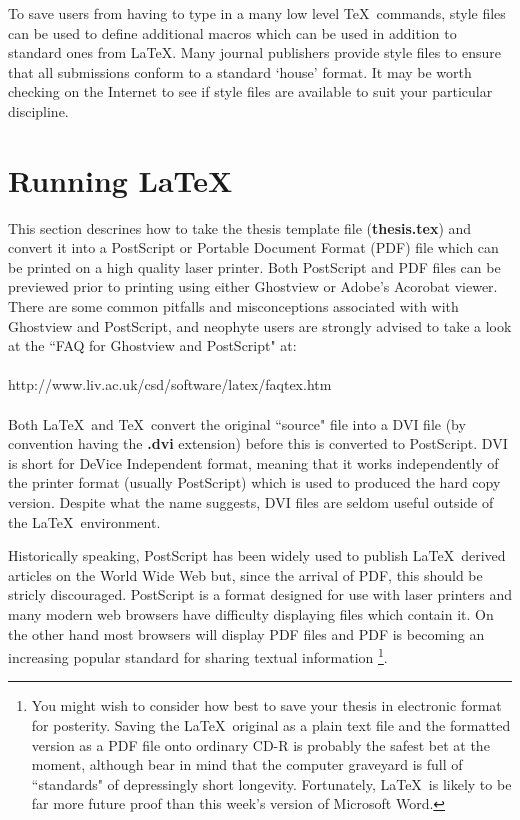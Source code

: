 \documentclass[11pt,oneside]{book}
\begin{document}
To save users from having to type in a many low level
\TeX \ commands, style files can be used to define additional
macros which can be used in addition to standard ones from
\LaTeX. Many journal publishers provide style files to ensure
that all submissions conform to a standard `house' format. It may
be worth checking on the Internet to see if style files are available
to suit your particular discipline.

\section{Running \LaTeX}
This section descrines how to take the thesis template file
({\bf thesis.tex}) and convert it into a PostScript or Portable
Document Format (PDF) file which can be printed on a high quality
laser printer. Both PostScript and PDF files can be previewed
prior to printing using either Ghostview or Adobe's Acorobat
viewer. There are some common pitfalls and misconceptions associated with
with Ghostview and PostScript, and neophyte users are strongly
advised to take a look at the ``FAQ for Ghostview and PostScript"
at:
\\
\\
http://www.liv.ac.uk/csd/software/latex/faqtex.htm
\\
\\
Both \LaTeX \ and \TeX \ convert the original ``source" file
into a DVI file (by convention having the {\bf .dvi} extension)
before this is converted to PostScript. DVI is short
for DeVice Independent format, meaning that it works
independently of the printer format (usually PostScript)
which is used to produced the hard copy version. Despite
what the name suggests, DVI files are seldom useful outside
of the \LaTeX \ environment.

Historically speaking, PostScript has been widely used to
publish \LaTeX \ derived articles
on the World Wide Web but, since the arrival of PDF, this should be
stricly discouraged. PostScript is a format designed for use with
laser printers and many modern web browsers have difficulty displaying
files which contain it. On the other hand most browsers will display
PDF files and PDF is becoming an increasing popular standard for sharing
textual information
\footnote{
You might wish to consider how best to save your thesis in electronic format
for posterity. Saving the \LaTeX \ original as a plain text file and
the formatted version as a PDF file
onto
ordinary CD-R is probably the safest bet at the moment, although bear in mind
that the computer graveyard is full of ``standards" of depressingly short longevity.
Fortunately, \LaTeX \ is likely to be far more future proof than this week's version
of Microsoft Word.
}.
\end{document}
